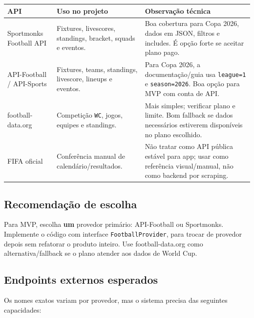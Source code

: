 \documentclass[12pt,a4paper]{article}
\begin{document}
\begin{longtable}{p{}p{}p{}}
\toprule
\textbf{API} & \textbf{Uso no projeto} & \textbf{Observação técnica} \\
\midrule
Sportmonks Football API & Fixtures, livescores, standings, bracket, squads e eventos. & Boa cobertura para Copa 2026, dados em JSON, filtros e includes. É opção forte se aceitar plano pago. \\
API-Football / API-Sports & Fixtures, teams, standings, livescore, lineups e eventos. & Para Copa 2026, a documentação/guia usa \texttt{league=1} e \texttt{season=2026}. Boa opção para MVP com conta de API. \\
football-data.org & Competição \texttt{WC}, jogos, equipes e standings. & Mais simples; verificar plano e limite. Bom fallback se dados necessários estiverem disponíveis no plano escolhido. \\
FIFA oficial & Conferência manual de calendário/resultados. & Não tratar como API pública estável para app; usar como referência visual/manual, não como backend por scraping. \\
\bottomrule
\end{longtable}

\subsection{Recomendação de escolha}

\begin{decisionbox}
Para MVP, escolha \textbf{um} provedor primário: API-Football ou Sportmonks. Implemente o código com interface \texttt{FootballProvider}, para trocar de provedor depois sem refatorar o produto inteiro. Use football-data.org como alternativa/fallback se o plano atender aos dados de World Cup.
\end{decisionbox}

\subsection{Endpoints externos esperados}

Os nomes exatos variam por provedor, mas o sistema precisa das seguintes capacidades:
\end{document}
